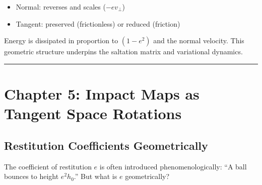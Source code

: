 \documentclass[
  letterpaper,
  DIV=11,
  numbers=noendperiod]{scrartcl}
\providecommand{\tightlist}{%
  \setlength{\itemsep}{0pt}\setlength{\parskip}{0pt}}\usepackage{longtable,booktabs,array}
\begin{document}
\begin{itemize}
\tightlist
\item
  Normal: reverses and scales (\(-e v_\perp\))
\item
  Tangent: preserved (frictionless) or reduced (friction)
\end{itemize}

Energy is dissipated in proportion to \((1-e^2)\) and the normal
velocity. This geometric structure underpins the saltation matrix and
variational dynamics.

\begin{center}\rule{0.5\linewidth}{0.5pt}\end{center}

\section{Chapter 5: Impact Maps as Tangent Space
Rotations}\label{sec-impact-maps}

\subsection{Restitution Coefficients
Geometrically}\label{restitution-coefficients-geometrically}

The coefficient of restitution \(e\) is often introduced
phenomenologically: ``A ball bounces to height \(e^2 h_0\).'' But what
is \(e\) geometrically?
\end{document}

